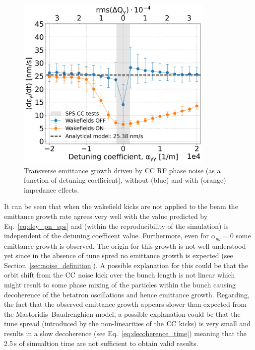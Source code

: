 \begin{figure}[!h] %
    \centering         
    \includegraphics[width=0.85\textwidth]{images/Ch7/deyRates_final_2018_PN_sps_270GeV_PN1e-8_400MHz_y-plane_QpxQpy5e-1_6D_Nb5e5_intensity3e10_ayyScan_wakesON_vs_OFF_vs_TuneSpreadvsExpectedSPS.png}
        \caption{Transverse emittance growth driven by CC RF phase noise (as a function of detuning coefficient), without (blue) and with (orange) impedance effects.}
        \label{fig:MD_2018_impedance_simulations_amplitude_detuning}
 \end{figure}

It can be seen that when the wakefield kicks are not applied to the beam the emittance growth rate agrees very well with the value predicted by Eq.~\eqref{eq:dey_pn_sps} and (within the reproducibility of the simulation) is independent of the detuning coefficent value. Furthermore, even for $\alpha_{yy}=0$ some emittance growth is observed. The origin for this growth is not well understood yet since in the absence of tune spred no emittance growth is expected (see Section~\ref{sec:noise_definition}). A possible explanation for this could be that the orbit shift from the ${\mathrm{CC}}$ noise kick over the bunch length is not linear which might result to some phase mixing of the particles within the bunch causing decoherence of the betatron oscillations and hence emittance growth. Regarding, the fact that the observed emittance growth appears slower than expected from the Mastoridis--Baudrenghien model, a possible explanation could be that the tune spread (introduced by the non-linearities of the ${\mathrm{CC}}$ kicks) is very small and results in a slow decoherence (see Eq.~\eqref{eq:decoherence_time}) meaning that the 2.5\,s of simualtion time are not sufficient to obtain valid results.

